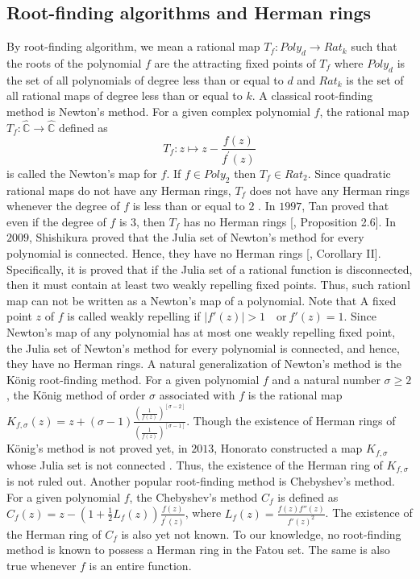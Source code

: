 \documentclass[12pt]{article}
\begin{document}
\par 






\subsection{Root-finding algorithms and Herman rings}
By root-finding algorithm, we mean a rational map $T_f:Poly_d \rightarrow Rat_k$ such that the roots of the polynomial $f$ are the attracting fixed points of $T_f$ where $Poly_d$ is the set of all polynomials of degree less than or equal to $d$ and $Rat_k$ is the set of all rational maps of degree less than or equal to $k$. A classical root-finding method is Newton's method. For a given complex polynomial $f$, the rational map $T_f:\widehat{\mathbb{C}}\rightarrow \widehat{\mathbb{C}} $ defined as $$ T_f: z\mapsto z- \frac{f(z)}{f^\prime (z)} $$ is called the Newton's map for $f$. If $f \in Poly_2$ then $T_f \in Rat_2$. Since quadratic rational maps do not have any Herman rings, $T_f$ does not have any Herman rings whenever the degree of $f$ is less than or equal to $2$ \cite{smm}. In $1997$, Tan proved that even if the  degree of $f$ is $3$, then $T_f$ has no Herman rings [\cite{Tan}, Proposition 2.6]. In $2009$, Shishikura proved that the Julia set of Newton's method for every polynomial is connected. Hence, they have no Herman rings [\cite{SH}, Corollary II]. Specifically, it is proved that if the Julia set of a rational function is disconnected, then it must contain at least two weakly repelling fixed points. Thus, such rationl map can not be written as a Newton's map of a polynomial.  Note that A fixed point $z$ of $f$ is called weakly repelling if $|f'(z)| > 1 \quad \text{or} ~ f'(z) = 1$. Since Newton's map of any polynomial has at most one weakly repelling fixed point, the Julia set of Newton's method for every polynomial is connected, and hence, they have no Herman rings. A natural generalization of Newton's method is the K\"{o}nig root-finding method. For a given polynomial $f$ and a natural number $\sigma\geq 2$, the K\"{o}nig method of order $\sigma$ associated with $f$ is the rational map $K_{f,\sigma}(z)=z+(\sigma-1)\frac{(\frac{1}{f(z)})^{[\sigma-2]}}{(\frac{1}{f(z)})^{[\sigma-1]}}$. Though the existence of Herman rings of K\"{o}nig's method is not proved yet, in $2013$, Honorato constructed a map $K_{f, \sigma}$ whose Julia set is not connected  \cite{hono}. Thus, the existence of the Herman ring of $K_{f, \sigma}$ is not ruled out.
Another popular root-finding method is Chebyshev's method. For a given polynomial $f$, the Chebyshev's method $C_f$ is defined as $C_f(z)=z-(1+\frac{1}{2}L_f(z))\frac{f(z)}{f^\prime(z)}$, where $L_f(z)=\frac{f(z)f''(z)}{{f'(z)}^2}$. The existence of the Herman ring of $C_f$ is also yet  not known. To our knowledge, no root-finding method is known to possess a Herman ring in the Fatou set. The same is also true whenever $f$ is an entire function.
\end{document}
